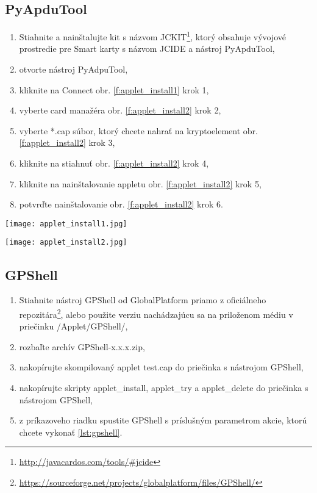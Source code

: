 \documentclass[12pt,a4wide,oneside,openright]{report}
\begin{document}
\subsection{PyApduTool} \label{s_applet_pytool}
	\begin{enumerate}
		\item Stiahnite a nainštalujte kit s názvom JCKIT\footnote{\url{http://javacardos.com/tools/\#jcide}}, ktorý obsahuje vývojové prostredie pre Smart karty s názvom JCIDE a nástroj PyApduTool,
		\item otvorte nástroj PyAdpuTool,
		\item kliknite na Connect obr. \ref{f:applet_install1} krok 1,
		\item vyberte card manažéra obr. \ref{f:applet_install2} krok 2,
		\item vyberte *.cap súbor, ktorý chcete nahrať na kryptoelement  obr. \ref{f:applet_install2} krok 3,
		\item kliknite na stiahnuť  obr. \ref{f:applet_install2} krok 4,
		\item kliknite na nainštalovanie appletu  obr. \ref{f:applet_install2} krok 5,
		\item potvrďte nainštalovanie  obr. \ref{f:applet_install2} krok 6. 
	\end{enumerate}
	
	\begin{figure*}[h]
		\centering
		\texttt{[image: applet\_install1.jpg]}
		\caption{Pripojenie čítačky kariet.}
		\label{f:applet_install1}
	\end{figure*}
	\begin{figure*}[h]
		\centering
		\texttt{[image: applet\_install2.jpg]}
		\caption{Nahratie appletu na kryptoelement.}
		\label{f:applet_install2}
	\end{figure*}
		
\subsection{GPShell} \label{s_applet_gpshell}
	\begin{enumerate}
		\item Stiahnite nástroj GPShell od GlobalPlatform priamo z oficiálneho repozitára\footnote{\url{https://sourceforge.net/projects/globalplatform/files/GPShell/}}, alebo použite verziu nachádzajúcu sa na priloženom médiu v priečinku /Applet/GPShell/, 
		\item rozbaľte archív GPShell-x.x.x.zip,
		\item nakopírujte skompilovaný applet test.cap do priečinka s nástrojom GPShell,
		\item nakopírujte skripty applet\_install, applet\_try a applet\_delete do priečinka s nástrojom GPShell,
		\item z príkazoveho riadku spustite GPShell s príslušným parametrom akcie, ktorú chcete vykonať \ref{lst:gpshell}.
	\end{enumerate}
\end{document}

